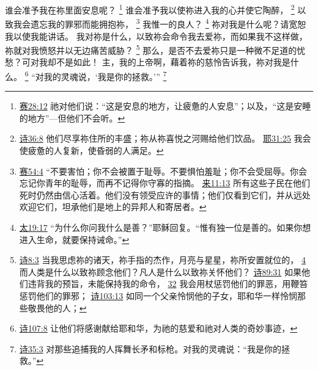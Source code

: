 \documentclass[12pt, a4paper, oneside]{ctexart}
\newcounter{parnum}[section]
\newcommand{\N}{%
   \noindent\refstepcounter{parnum}%
    \makebox[\parindent][l]{\textbf{\arabic{parnum}.}}}
\begin{document}
\N 谁会准予我在祢里面安息呢？
    \footnote {
		\href{https://biblehub.com/isaiah/28-12.htm}{赛28:12} 祂对他们说：“这是安息的地方，让疲惫的人安息”；以及，“这是安睡的地方”---但他们不会听。
	}
	谁会准予我以使祢进入我的心并使它陶醉，
    \footnote {
        \href{https://biblehub.com/psalms/36-8.htm}{诗36:8} 他们尽享祢住所的丰盛；祢从祢喜悦之河赐给他们饮品。
		\href{https://biblehub.com/jeremiah/31-25.htm}{耶31:25} 我会使疲惫的人复新，使昏弱的人满足。
	}
    以致我会遗忘我的罪邪而能拥抱祢，
    \footnote {
        \href{https://biblehub.com/isaiah/54-4.htm}{赛54:4} “不要害怕；你不会被置于耻辱。不要惧怕羞耻；你不会受屈辱。你会忘记你青年的耻辱，而再不记得你守寡的指摘。
		\href{https://biblehub.com/hebrews/11-13.htm}{来11:13} 所有这些子民在他们死时仍然由信心活着。他们没有领受应许的事情；他们仅看到它们，并从远处欢迎它们，坦承他们是地上的异邦人和寄居者。
	}
    我惟一的良人？
    \footnote {
        \href{https://biblehub.com/matthew/19-17.htm}{太19:17} “为什么你问我什么是善？”耶稣回复。“惟有独一位是善的。如果你想进入生命，就要保持诫命。”
	}
	祢对我是什么呢？请宽恕我以使我能讲话。
	我对祢是什么，以致祢会命令我去爱祢，而如果我不这样做，祢就对我愤怒并以无边痛苦威胁？
    \footnote {
        \href{https://biblehub.com/psalms/8-3.htm}{诗8:3} 当我思虑祢的诸天，祢手指的杰作，月亮与星星，祢所安置就位的，
		\href{https://biblehub.com/psalms/8-4.htm}{4} 而人类是什么以致祢顾念他们？凡人是什么以致祢关怀他们？
        \href{https://biblehub.com/psalms/89-31.htm}{诗89:31} 如果他们违背我的预旨，未能保持我的命令，
		\href{https://biblehub.com/psalms/89-32.htm}{32} 我会用杖惩罚他们的罪恶，用鞭笞惩罚他们的罪邪；
        \href{https://biblehub.com/psalms/103-13.htm}{诗103:13} 如同一个父亲怜悯他的子女，耶和华一样怜悯那些敬畏他的人；
	}
	那么，是否不去爱祢只是一种微不足道的忧愁？可对我却不是如此！
	主，我的上帝啊，藉着祢的慈怜告诉我，祢对我是什么。
    \footnote {
        \href{https://biblehub.com/psalms/107-8.htm}{诗107:8} 让他们将感谢献给耶和华，为祂的慈爱和祂对人类的奇妙事迹，
	}
	“对我的灵魂说，‘我是你的拯救。’”
    \footnote {
        \href{https://biblehub.com/psalms/35-3.htm}{诗35:3} 对那些追捕我的人挥舞长矛和标枪。对我的灵魂说：“我是你的拯救。”
	}
\end{document}
